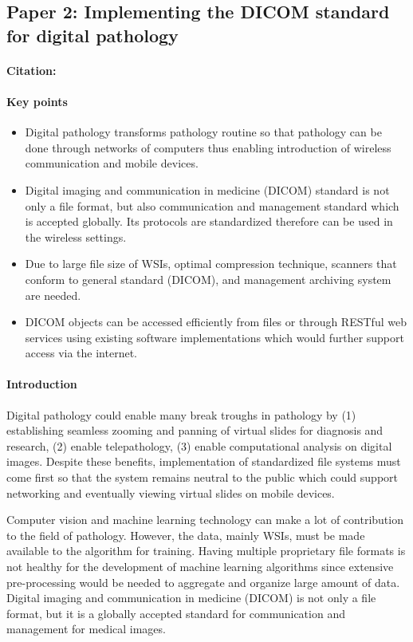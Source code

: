 \documentclass{article}
\begin{document}
\subsection{Paper 2: Implementing the DICOM standard for digital pathology}
\paragraph{Citation:} \cite{Herrmann2018}
\paragraph{Key points}
\begin{itemize}
  \item Digital pathology transforms pathology routine so that pathology can be done through networks of computers thus enabling introduction of wireless communication and mobile devices. 
  \item Digital imaging and communication in medicine (DICOM) standard is not only a file format, but also communication and management standard which is accepted globally. Its protocols are standardized therefore can be used in the wireless settings. 
  \item Due to large file size of WSIs, optimal compression technique, scanners that conform to general standard (DICOM), and management archiving system are needed. 
  \item DICOM objects can be accessed efficiently from files or through RESTful web services using existing software implementations which would further support access via the internet.
\end{itemize}

\paragraph{Introduction}
Digital pathology could enable many break troughs in pathology by (1) establishing seamless zooming and panning of virtual slides for diagnosis and research, (2) enable telepathology, (3) enable computational analysis on digital images. Despite these benefits, implementation of standardized file systems must come first so that the system remains neutral to the public which could support networking and eventually viewing virtual slides on mobile devices. 

Computer vision and machine learning technology can make a lot of contribution to the field of pathology. However, the data, mainly WSIs, must be made available to the algorithm for training. Having multiple proprietary file formats is not healthy for the development of machine learning algorithms since extensive pre-processing would be needed to aggregate and organize large amount of data. Digital imaging and communication in medicine (DICOM) is not only a file format, but it is a globally accepted standard for communication and management for medical images. 
\end{document}
